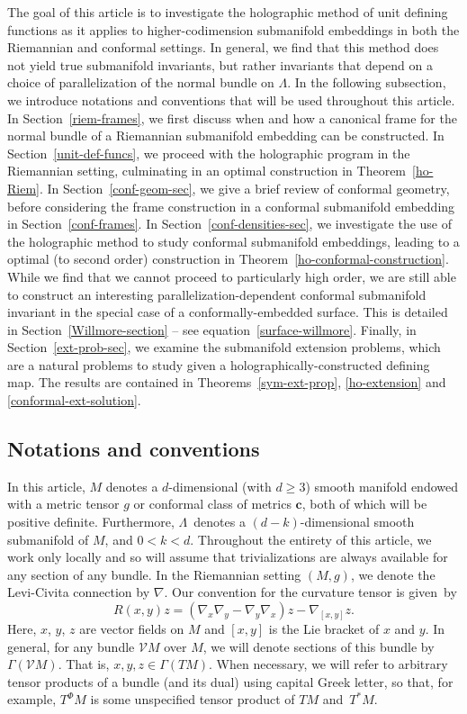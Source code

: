 \documentclass[10pt,a4paper]{article}
\numberwithin{equation}{section}
\newcommand{\cc}{\boldsymbol{c}}
\renewcommand{\=}{\stackrel \Lambda =}
\begin{document}
The goal of this article is to investigate the holographic method of unit defining functions as it applies to higher-codimension submanifold embeddings in both the Riemannian and conformal settings. In general, we find that this method does not yield true submanifold invariants, but rather invariants that depend on a choice of parallelization of the normal bundle on $\Lambda$. In the following subsection, we introduce notations and conventions that will be used throughout this article. In Section~\ref{riem-frames}, we first discuss when and how a canonical frame for the normal bundle of a Riemannian submanifold embedding can be constructed. In Section~\ref{unit-def-funcs}, we proceed with the holographic program in the Riemannian setting, culminating in an optimal construction in Theorem~\ref{ho-Riem}. In Section~\ref{conf-geom-sec}, we give a brief review of conformal geometry, before considering the frame construction in a conformal submanifold embedding in Section~\ref{conf-frames}. In Section~\ref{conf-densities-sec}, we investigate the use of the holographic method to study conformal submanifold embeddings, leading to a optimal (to second order) construction in Theorem~\ref{ho-conformal-construction}. While we find that we cannot proceed to particularly high order, we are still able to construct an interesting parallelization-dependent conformal submanifold invariant in the special case of a conformally-embedded surface. This is detailed in Section~\ref{Willmore-section} -- see equation~\eqref{surface-willmore}. Finally, in Section~\ref{ext-prob-sec}, we examine the submanifold extension problems, which are a natural problems to study given a holographically-constructed defining map. The results are contained in Theorems~\ref{sym-ext-prop}, \ref{ho-extension} and \ref{conformal-ext-solution}.

\subsection{Notations and conventions}
In this article, $M$ denotes a $d$-dimensional (with $d \geq 3$) smooth manifold endowed with a metric tensor $g$ or conformal class of metrics $\cc$, both of which will be positive definite. Furthermore, $\Lambda$~denotes a $(d-k)$-dimensional smooth submanifold of $M$, and $0 < k < d$. Throughout the entirety of this article, we work only locally and so will assume that trivializations are always available for any section of any bundle. In the Riemannian setting $(M,g)$, we denote the Levi-Civita connection by $\nabla$. Our convention for the curvature tensor is given~by
\[
R(x,y)z = (\nabla_x \nabla_y - \nabla_y \nabla_x)z - \nabla_{[x,y]} z .
\]
Here, $x$, $y$, $z$ are vector fields on $M$ and $[x,y]$ is the Lie bracket of $x$ and $y$. In general, for any bundle $\mathcal{V}M$ over $M$, we will denote sections of this bundle by $\Gamma(\mathcal{V} M)$. That is, $x,y,z \in \Gamma(TM)$. When necessary, we will refer to arbitrary tensor products of a bundle (and its dual) using capital Greek letter, so that, for example, $T^\Phi M$ is some unspecified tensor product of $TM$ and~$T^* M$.
\end{document}
